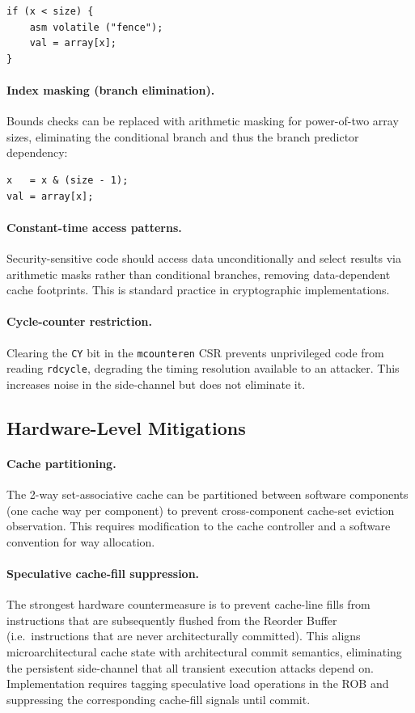\begin{verbatim}
if (x < size) {
    asm volatile ("fence");
    val = array[x];
}
\end{verbatim}

\paragraph{Index masking (branch elimination).}
Bounds checks can be replaced with arithmetic masking for power-of-two array sizes,
eliminating the conditional branch and thus the branch predictor dependency:

\begin{verbatim}
x   = x & (size - 1);
val = array[x];
\end{verbatim}

\paragraph{Constant-time access patterns.}
Security-sensitive code should access data unconditionally and select results via
arithmetic masks rather than conditional branches, removing data-dependent cache
footprints.  This is standard practice in cryptographic implementations.

\paragraph{Cycle-counter restriction.}
Clearing the \texttt{CY} bit in the \texttt{mcounteren} CSR prevents unprivileged
code from reading \texttt{rdcycle}, degrading the timing resolution available to
an attacker.  This increases noise in the side-channel but does not eliminate it.

\subsection{Hardware-Level Mitigations}

\paragraph{Cache partitioning.}
The 2-way set-associative cache can be partitioned between software components
(one cache way per component) to prevent cross-component cache-set eviction
observation.  This requires modification to the cache controller and a software
convention for way allocation.

\paragraph{Speculative cache-fill suppression.}
The strongest hardware countermeasure is to prevent cache-line fills from instructions
that are subsequently flushed from the Reorder Buffer (i.e.\ instructions that are
never architecturally committed).  This aligns microarchitectural cache state with
architectural commit semantics, eliminating the persistent side-channel that all
transient execution attacks depend on.  Implementation requires tagging speculative
load operations in the ROB and suppressing the corresponding cache-fill signals until
commit.

